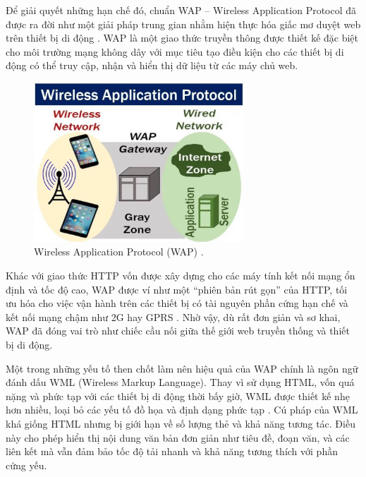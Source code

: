   \vspace{0.5em}
  
  \hspace*{0.8cm}Để giải quyết những hạn chế đó, chuẩn WAP – Wireless Application Protocol đã được ra đời như một giải pháp trung gian nhằm hiện thực hóa giấc mơ duyệt web trên thiết bị di động \cite{wap-intro}. WAP là một giao thức truyền thông được thiết kế đặc biệt cho môi trường mạng không dây với mục tiêu tạo điều kiện cho các thiết bị di động có thể truy cập, nhận và hiển thị dữ liệu từ các máy chủ web.
  

\begin{figure}[H]
  \centering
  \includegraphics[width=0.7\textwidth]{images/Wireless-Application-Protocol-WAP-la-gi.jpg}
  \caption{Wireless Application Protocol (WAP) \cite{bkhostWAP}.}
  \label{fig:fig7}
\end{figure}
  
  
  \hspace*{0.8cm}Khác với giao thức HTTP vốn được xây dựng cho các máy tính kết nối mạng ổn định và tốc độ cao, WAP được ví như một “phiên bản rút gọn” của HTTP, tối ưu hóa cho việc vận hành trên các thiết bị có tài nguyên phần cứng hạn chế và kết nối mạng chậm như 2G hay GPRS \cite{wap-vs-http}. Nhờ vậy, dù rất đơn giản và sơ khai, WAP đã đóng vai trò như chiếc cầu nối giữa thế giới web truyền thống và thiết bị di động.
  
  \vspace{0.5em}
  
  \hspace*{0.8cm}Một trong những yếu tố then chốt làm nên hiệu quả của WAP chính là ngôn ngữ đánh dấu WML (Wireless Markup Language). Thay vì sử dụng HTML, vốn quá nặng và phức tạp với các thiết bị di động thời bấy giờ, WML được thiết kế nhẹ hơn nhiều, loại bỏ các yếu tố đồ họa và định dạng phức tạp \cite{wml-design}. Cú pháp của WML khá giống HTML nhưng bị giới hạn về số lượng thẻ và khả năng tương tác. Điều này cho phép hiển thị nội dung văn bản đơn giản như tiêu đề, đoạn văn, và các liên kết mà vẫn đảm bảo tốc độ tải nhanh và khả năng tương thích với phần cứng yếu.
  

